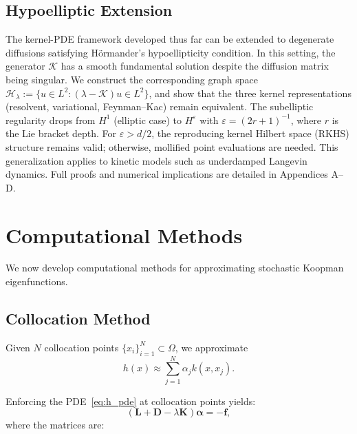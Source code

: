 \documentclass[11pt,a4paper]{article}
\newcommand{\bK}{\mathbf{K}}
\newcommand{\bL}{\mathbf{L}}
\newcommand{\bD}{\mathbf{D}}
\begin{document}
\subsection{Hypoelliptic Extension}

The kernel-PDE framework developed thus far can be extended to degenerate diffusions satisfying H\"{o}rmander's hypoellipticity condition. In this setting, the generator $\mathcal{K}$ has a smooth fundamental solution despite the diffusion matrix being singular. We construct the corresponding graph space $\mathcal{H}_\lambda := \{u \in L^2 : (\lambda - \mathcal{K})u \in L^2\}$, and show that the three kernel representations (resolvent, variational, Feynman--Kac) remain equivalent. The subelliptic regularity drops from $H^1$ (elliptic case) to $H^\varepsilon$ with $\varepsilon = (2r+1)^{-1}$, where $r$ is the Lie bracket depth. For $\varepsilon > d/2$, the reproducing kernel Hilbert space (RKHS) structure remains valid; otherwise, mollified point evaluations are needed. This generalization applies to kinetic models such as underdamped Langevin dynamics. Full proofs and numerical implications are detailed in Appendices A–D.


\section{Computational Methods}\label{sec:computational}

We now develop computational methods for approximating stochastic Koopman eigenfunctions.

\subsection{Collocation Method}

Given $N$ collocation points $\{x_i\}_{i=1}^N \subset \Omega$, we approximate
\begin{equation}
h(x) \approx \sum_{j=1}^N \alpha_j k(x, x_j).
\end{equation}

Enforcing the PDE~\eqref{eq:h_pde} at collocation points yields:
\begin{equation}\label{eq:collocation_system}
(\bL + \bD - \lambda \bK)\boldsymbol{\alpha} = -\mathbf{f},
\end{equation}
where the matrices are:
\end{document}
